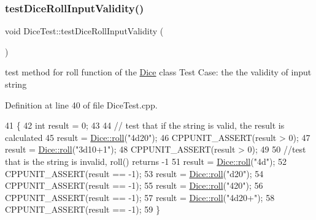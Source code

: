 \hypertarget{class_dice_test_a3e9f2421e914d4f18de2327828345860}{}\label{class_dice_test_a3e9f2421e914d4f18de2327828345860} 
\subsubsection{\texorpdfstring{test\+Dice\+Roll\+Input\+Validity()}{testDiceRollInputValidity()}}
{\footnotesize\ttfamily void Dice\+Test\+::test\+Dice\+Roll\+Input\+Validity (\begin{DoxyParamCaption}{ }\end{DoxyParamCaption})\hspace{0.3cm}{\ttfamily [protected]}}

test method for roll function of the \hyperlink{class_dice}{Dice} class Test Case\+: the the validity of input string 

Definition at line 40 of file Dice\+Test.\+cpp.


\begin{DoxyCode}
41 \{
42     \textcolor{keywordtype}{int} result = 0;
43     
44     \textcolor{comment}{// test that if the string is valid, the result is calculated}
45     result = \hyperlink{class_dice_a4923bdf22040579e6e071e1e987916c2}{Dice::roll}(\textcolor{stringliteral}{"4d20"});
46     CPPUNIT\_ASSERT(result > 0);
47     result = \hyperlink{class_dice_a4923bdf22040579e6e071e1e987916c2}{Dice::roll}(\textcolor{stringliteral}{"3d10+1"});
48     CPPUNIT\_ASSERT(result > 0);
49 
50     \textcolor{comment}{//test that is the string is invalid, roll() returns -1}
51     result = \hyperlink{class_dice_a4923bdf22040579e6e071e1e987916c2}{Dice::roll}(\textcolor{stringliteral}{"4d"});
52     CPPUNIT\_ASSERT(result == -1);
53     result = \hyperlink{class_dice_a4923bdf22040579e6e071e1e987916c2}{Dice::roll}(\textcolor{stringliteral}{"d20"});
54     CPPUNIT\_ASSERT(result == -1);
55     result = \hyperlink{class_dice_a4923bdf22040579e6e071e1e987916c2}{Dice::roll}(\textcolor{stringliteral}{"420"});
56     CPPUNIT\_ASSERT(result == -1);
57     result = \hyperlink{class_dice_a4923bdf22040579e6e071e1e987916c2}{Dice::roll}(\textcolor{stringliteral}{"4d20+"});
58     CPPUNIT\_ASSERT(result == -1);
59 \}
\end{DoxyCode}
\hypertarget{class_dice_test_ac46b7044f229250c84b8dafaf432c80d}{}\label{class_dice_test_ac46b7044f229250c84b8dafaf432c80d} 
